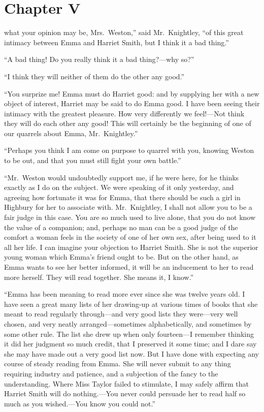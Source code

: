 \chapter{Chapter V}


 what your opinion may be, Mrs.\ Weston,'' said Mr.\ Knightley, ``of
this great intimacy between Emma and Harriet Smith, but I think it a bad thing.''

``A bad thing! Do you really think it a bad thing?---why so?''

``I think they will neither of them do the other any good.''

``You surprize me! Emma must do Harriet good: and by supplying her
with a new object of interest, Harriet may be said to do Emma good.
I have been seeing their intimacy with the greatest pleasure.
How very differently we feel!---Not think they will do each other any
good! This will certainly be the beginning of one of our quarrels
about Emma, Mr.\ Knightley.''

``Perhaps you think I am come on purpose to quarrel with you,
knowing Weston to be out, and that you must still fight your own battle.''

``Mr.\ Weston would undoubtedly support me, if he were here,
for he thinks exactly as I do on the subject.  We were speaking
of it only yesterday, and agreeing how fortunate it was for Emma,
that there should be such a girl in Highbury for her to associate with.
Mr.\ Knightley, I shall not allow you to be a fair judge in this case.
You are so much used to live alone, that you do not know the value
of a companion; and, perhaps no man can be a good judge of the comfort
a woman feels in the society of one of her own sex, after being used
to it all her life.  I can imagine your objection to Harriet Smith.
She is not the superior young woman which Emma's friend ought to be.
But on the other hand, as Emma wants to see her better informed,
it will be an inducement to her to read more herself.  They will
read together.  She means it, I know.''

``Emma has been meaning to read more ever since she was twelve
years old.  I have seen a great many lists of her drawing-up at
various times of books that she meant to read regularly through---and
very good lists they were---very well chosen, and very neatly
arranged---sometimes alphabetically, and sometimes by some other rule.
The list she drew up when only fourteen---I remember thinking it
did her judgment so much credit, that I preserved it some time;
and I dare say she may have made out a very good list now.  But I
have done with expecting any course of steady reading from Emma.
She will never submit to any thing requiring industry and patience,
and a subjection of the fancy to the understanding.  Where Miss Taylor
failed to stimulate, I may safely affirm that Harriet Smith will do
nothing.---You never could persuade her to read half so much as you
wished.---You know you could not.''

